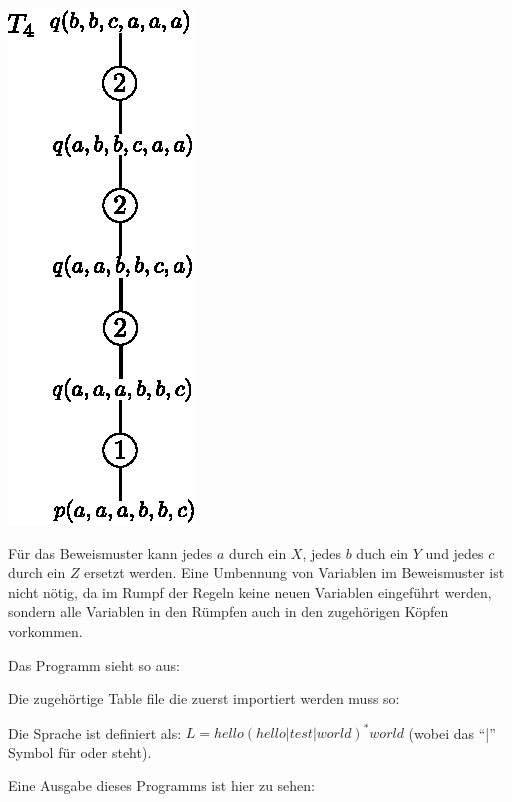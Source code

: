 \documentclass[12pt,a4paper]{amsart}
\begin{document}
\begin{aufgabe1}
\begin{center}
\includegraphics[]{t4.eps}
\end{center}
Für das Beweismuster kann jedes $a$ durch ein $X$, jedes $b$ duch ein $Y$ und jedes $c$ durch ein $Z$ ersetzt werden. Eine Umbennung von Variablen im Beweismuster
ist nicht nötig, da im Rumpf der Regeln keine neuen Variablen eingeführt werden, sondern alle Variablen in den Rümpfen auch in den zugehörigen Köpfen vorkommen.
\end{aufgabe1}


\begin{aufgabe1}
Das Programm sieht so aus:


Die zugehörtige Table file die zuerst importiert werden muss so:


Die Sprache ist definiert als: $L=hello(hello | test | world)^{\ast}world$ (wobei das ``|'' Symbol für oder steht).

Eine Ausgabe dieses Programms ist hier zu sehen:



\end{aufgabe1}
\end{document}
